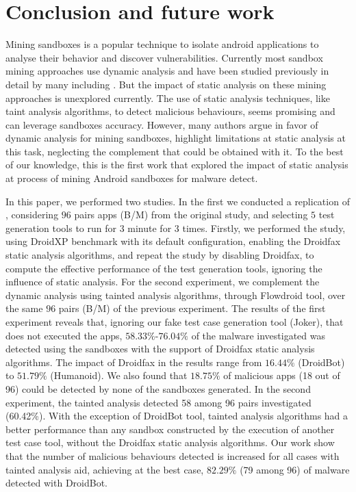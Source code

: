 \section{Conclusion and future work}

Mining sandboxes is a popular technique to isolate android applications to analyse their behavior and discover vulnerabilities. Currently most sandbox mining approaches use dynamic analysis and have been studied previously in detail by many including \blls. But the impact of static analysis on these mining approaches is unexplored currently. The use of static analysis techniques, like taint analysis algorithms, to detect malicious behaviours, seems promising and can leverage sandboxes accuracy. However, many authors argue in favor of dynamic analysis for  mining sandboxes, highlight limitations at static analysis at this task, neglecting the complement that could be obtained with it. To the best of our knowledge, this is the first work that explored the impact of static analysis at process of mining Android sandboxes for malware detect.

In this paper, we performed two studies. In the first we conducted a replication of \blls, considering $96$ pairs apps (B/M) from the original study, and selecting $5$ test generation tools to run for $3$ minute for $3$ times. Firstly, we performed the study, using DroidXP benchmark with its default configuration, enabling the Droidfax static analysis algorithms, and repeat the study by disabling Droidfax, to compute the effective performance of the test generation tools, ignoring the influence of static analysis. For the second experiment, we complement the dynamic analysis using tainted analysis algorithms, through Flowdroid tool, over the same $96$ pairs (B/M) of the previous experiment. The results of the first experiment reveals that, ignoring our fake test case generation tool (Joker), that does not executed the apps, $58.33\%$-$76.04\%$ of the malware investigated was detected using the sandboxes with the support of Droidfax static analysis algorithms. The impact of Droidfax in the results range from $16.44\%$ (DroidBot) to $51.79\%$ (Humanoid). We also found that $18.75\%$ of malicious apps (18 out of 96) could be detected by none of the sandboxes generated. In the second experiment, the tainted analysis detected 58 among 96 pairs investigated (60.42\%). With the exception of DroidBot tool, tainted analysis algorithms had a better performance than any sandbox constructed by the execution of another test case tool, without the Droidfax static analysis algorithms. Our work show that the number of malicious behaviours detected is increased for all cases with tainted analysis aid, achieving at the best case, $82.29\%$ (79 among 96) of malware detected with DroidBot.

